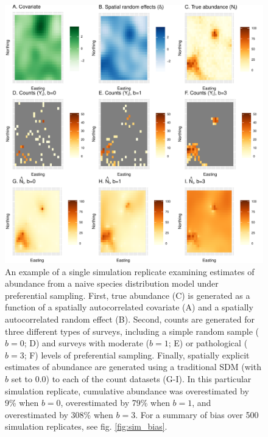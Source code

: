 \documentclass[times,mee,doublespace,]{besauth2}
\begin{document}
\begin{figure} %
\begin{center}
\includegraphics[width=170mm]{Pref_samp_sim_maps.pdf}
\caption{An example of a single simulation replicate examining estimates of abundance from a naive species distribution model under preferential sampling.  First, true abundance (C) is generated as a function of a spatially autocorrelated covariate (A) and a spatially autocorrelated random effect (B). Second, counts are generated for three different types of surveys, including a simple random sample ($b=0$; D) and surveys with moderate ($b=1$; E) or pathological ($b=3$; F) levels of preferential sampling.  Finally, spatially explicit estimates of abundance are generated using a traditional SDM (with $b$ set to 0.0) to each of the count datasets (G-I).  In this particular simulation replicate, cumulative abundance was overestimated by 9\% when $b=0$, overestimated by 79\% when $b=1$, and overestimated by 308\% when $b=3$.  For a summary of bias over 500 simulation replicates, see fig. \ref{fig:sim_bias}.}
\label{fig:PS_sims}
\end{center}
\end{figure}
\end{document}

